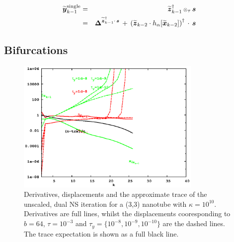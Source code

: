 \documentclass[letterpaper,twocolumn,amsmath,amsfont,amssymb,english,aps,jcp,preprintnumbers,groupaddress,nofootinbib,tightenlines,floatfix]{revtex4}
\newcommand{\mat}[1]{\boldsymbol{#1}}
\newcommand{\ot}{  {\scriptstyle \otimes}_{ \tau } }
\theoremstyle{plain}
\theoremstyle{remark}
\theoremstyle{plain}
\begin{document}
\begin{eqnarray}
\widetilde{\mat{y}}^{\rm single}_{k-1} &=& \widetilde{\mat{z}}^{\dagger}_{k-1} \, \ot \, \mat{s} \\
                                  &=& \mat{\Delta}^{\widetilde{\mat{z}}^\dagger_{k-1} \cdot \, \mat{s}} \, + \,
\left( \widetilde{\mat{z}}_{k-2} \cdot h_\alpha[ \widetilde{\mat{x}}_{k-2}] \right)^\dagger \, \cdot \, \mat{s}
\end{eqnarray}

\subsection{Bifurcations}

\begin{figure}[h] \label{flow_noscale_dual}
\includegraphics[width=3.5in]{fig_33_tube_cond_10_noscaling/33_nanotube_cond10_noscale_dual.eps}
\caption{Derivatives, displacements and the approximate trace of the unscaled, dual NS iteration for a (3,3) nanotube with $\kappa =10^{10}$.
Derivatives are full lines, whilst the displacements cooresponding to $b=64$, $\tau=10^{-3}$ and $\tau_y=\{10^{-8}, 10^{-9}, 10^{-10}\}$
are the dashed lines.  The trace expectation is shown as a full black line. }
\end{figure}


\end{document}
